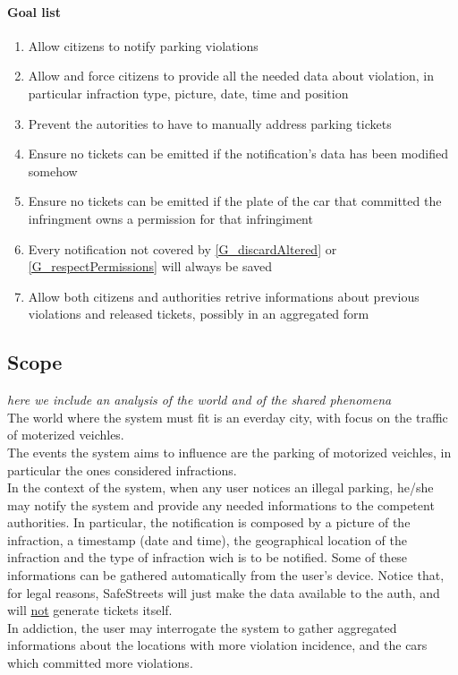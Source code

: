 \documentclass{article}
\newcommand{\enum}[1]{\texttt{#1.\arabic*}}
\begin{document}
		\paragraph{Goal list}
			\begin{enumerate}[label=\enum{G}]
				\item  \label{G_realTime}Allow citizens to notify parking violations
				\item \label{G_allData}Allow and force citizens to provide all the needed data about violation, in particular infraction type, picture, date, time and position
				\item \label{G_helpAuth}Prevent the autorities to have to manually address parking tickets
				\item \label{G_discardAltered} Ensure no tickets can be emitted if the notification's data has been modified somehow
				\item \label{G_respectPermissions} Ensure no tickets can be emitted if the plate of the car that committed the infringment owns a permission for that infringiment
				\item \label{G_storeFine} Every notification not covered by \ref{G_discardAltered} or \ref{G_respectPermissions} will always be saved
				\item \label{G_statistics}Allow both citizens and authorities retrive informations about previous violations and released tickets, possibly in an aggregated form 
			\end{enumerate}

	\subsection{Scope} \textit{here we include an analysis of the world and of the shared phenomena}\\
	The world where the system must fit is an everday city, with focus on the traffic of moterized veichles.\\
	The events the system aims to influence are the parking of motorized veichles,  in particular the ones considered infractions.\\
	In the context of the system, when any user notices an illegal parking, he/she may notify the system and provide any needed informations to the competent authorities. In particular, the notification is composed by a picture of the infraction, a timestamp (date and time), the geographical location of the infraction and the type of infraction wich is to be notified. Some of these informations can be gathered automatically from the user's device. Notice that, for legal reasons, SafeStreets will just make the data available to the auth, and will \underline{not} generate tickets itself. \\
	In addiction, the user may interrogate the system to gather aggregated informations about the locations with more violation incidence, and the cars which committed more violations. 
	
\end{document}
